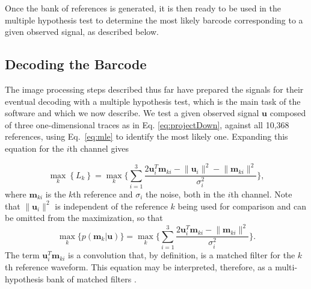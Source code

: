 Once the bank of references is generated, it is then ready to be used in the multiple hypothesis test to determine the most likely barcode corresponding to a given observed signal, as described below. 



\subsection{Decoding the Barcode}\label{sec:decoding}
The image processing steps described thus far have prepared the signals for their eventual decoding with a multiple hypothesis test, which is the main task of the software and which we now describe.  We test a given observed signal $\mathbf{u}$ composed of three one-dimensional traces as in Eq. 
\ref{eq:projectDown}, against all 10,368 references, using Eq.~\ref{eq:mle} to identify the most likely one. Expanding this equation for the $i$th channel gives

\begin{equation}
\max_k   \left\{ L_k \right\} =  \max_k  \Bigg\{ \sum_{i=1}^3  \frac{  2 \mathbf{u}_i ^T \mathbf{m}_{ki} - \lVert \mathbf{u}_i \rVert^2  - \lVert \mathbf{m}_{ki} \rVert^2   }{\sigma_i^2}  \Bigg\}, 
\end{equation}
where $\mathbf{m}_{ki}$  is the $k$th reference and $\sigma_i$ the noise, both in the $i$th channel. Note that $\lVert \mathbf{u}_i \rVert^2$  is independent of the reference $k$ being used for comparison and can be omitted from the maximization, so that
\begin{equation}
\max_k   \big\{  p(\mathbf{m}_k|\mathbf{u}) \big\} =  \max_k  \Bigg\{ \sum_{i=1}^3  \frac{  2 \mathbf{u}_i ^T \mathbf{m}_{ki}  - \lVert \mathbf{m}_{ki} \rVert^2   }{\sigma_i^2}  \Bigg\}. 
\end{equation}
The term $\mathbf{u}_i ^T \mathbf{m}_{ki}$ is a convolution that, by definition, is a matched filter for the $k$th reference waveform. This equation may be interpreted, therefore, as a multi-hypothesis bank of matched filters \citep{helstrom_statistical_1968}.

